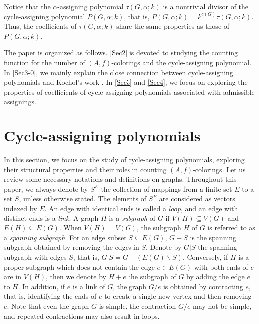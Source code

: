 \documentclass[12pt]{article}%
\numberwithin{equation}{section}
\begin{document}
Notice that the $\alpha$-assigning polynomial $\tau(G,\alpha;k)$ is a nontrivial divisor of the cycle-assigning polynomial $P(G,\alpha;k)$, that is, $P(G,\alpha;k)=k^{c(G)}\tau(G,\alpha;k)$.
Thus, the coefficients of $\tau(G,\alpha;k)$ share the same properties as those of  $P(G,\alpha;k)$. 

The paper is organized as follows. \autoref{Sec2} is devoted to studying the counting function for the number of $(A,f)$-colorings and the cycle-assigning polynomial. In \autoref{Sec3-0}, we mainly explain the close connection between cycle-assigning polynomials and Kochol's work \cite{Kochol2024}.  In \autoref{Sec3} and \autoref{Sec4}, we focus on exploring the properties of coefficients of cycle-assigning polynomials associated with admissible assignings.

\section{Cycle-assigning polynomials}\label{Sec2}
In this section, we focus on the study of cycle-assigning polynomials, exploring their structural properties and their roles in counting $(A,f)$-colorings. Let us review some necessary notations and definitions on graphs. Throughout this paper, we always denote by $S^E$ the collection of mappings from a finite set $E$ to a set $S$, unless otherwise stated. The elements of $S^E$ are considered as vectors indexed by $E$. An edge with identical ends is called a {\em loop}, and an edge with distinct ends is a {\em link}. A graph $H$ is a {\em subgraph} of $G$ if $V(H)\subseteq V(G)$ and $E(H)\subseteq E(G)$. When $V(H)=V(G)$, the subgraph $H$ of $G$ is referred to as a {\em spanning subgraph}. For an edge subset $S\subseteq E(G)$, $G-S$ is the spanning subgraph obtained by removing the edges in $S$. Denote by $G|S$ the spanning subgraph with edges $S$, that is, $G|S=G-(E(G)\smallsetminus S)$. Conversely, if $H$ is a proper subgraph which does not contain the edge $e \in E(G)$ with  both ends of $e$ are in $V(H)$, then we denote  by $H+e$ the subgraph of $G$ by adding the edge $e$ to $H$.  In addition, if $e$ is a link of $G$, the graph $G/e$ is obtained by contracting $e$, that is, identifying the ends of $e$ to create a single new vertex and then removing $e$.  Note that even the graph $G$ is simple, the contraction $G/e$ may not be simple, and repeated contractions may also result in loops. 
\end{document}
